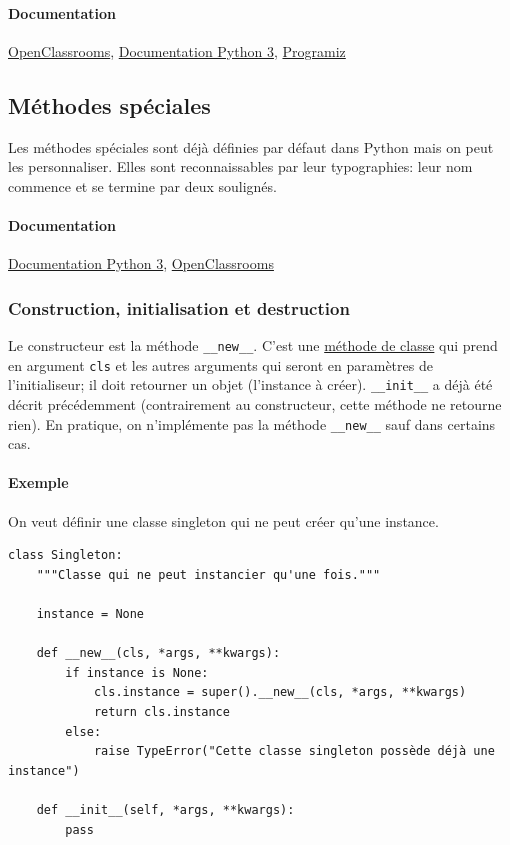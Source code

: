 \documentclass[a4paper, 10pt]{article}
\newcommand{\code}[1]{{\small\texttt{#1}}}
\begin{document}
\paragraph{Documentation} \href{https://openclassrooms.com/courses/apprenez-a-programmer-en-python/l-heritage-9}{OpenClassrooms}, \href{https://docs.python.org/fr/3/tutorial/classes.html?highlight=héritage#inheritance}{Documentation Python 3}, \href{https://www.programiz.com/python-programming/inheritance}{Programiz}
\subsection{Méthodes spéciales}
 Les méthodes spéciales sont déjà définies par défaut dans Python mais on peut les personnaliser. Elles sont reconnaissables par leur typographies: leur nom commence et se termine par deux soulignés.

\paragraph{Documentation} \href{https://docs.python.org/3/reference/datamodel.html#specialnames}{Documentation Python 3}, \href{https://openclassrooms.com/courses/apprenez-a-programmer-en-python/les-methodes-speciales-1}{OpenClassrooms}


\subsubsection{Construction, initialisation et destruction}
Le constructeur est la méthode \code{\_\_new\_\_}. C'est une \hyperref[sec:classmethod]{méthode de classe} qui prend en argument \code{cls} et les autres arguments qui seront en paramètres de l'initialiseur; il doit retourner un objet (l'instance à créer). \code{\_\_init\_\_} a déjà été décrit précédemment (contrairement au constructeur, cette méthode ne retourne rien). En pratique, on n'implémente pas la méthode \code{\_\_new\_\_} sauf dans certains cas.

\paragraph{Exemple} On veut définir une classe \og singleton \fg{} qui ne peut créer qu'une instance.

\begin{verbatim}
class Singleton:
    """Classe qui ne peut instancier qu'une fois."""

    instance = None

    def __new__(cls, *args, **kwargs):
        if instance is None:
            cls.instance = super().__new__(cls, *args, **kwargs)
            return cls.instance
        else:
            raise TypeError("Cette classe singleton possède déjà une instance")

    def __init__(self, *args, **kwargs):
        pass
\end{verbatim}
\end{document}
